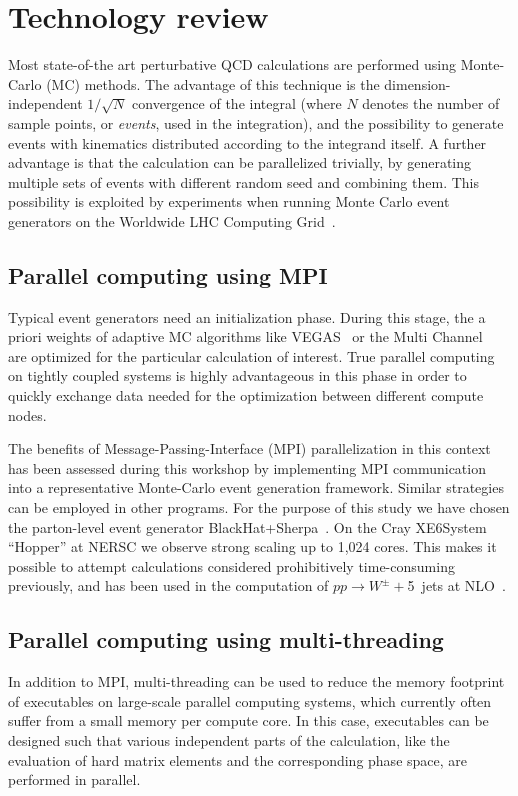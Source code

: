 \section{Technology review}
Most state-of-the art perturbative QCD calculations are performed
using Monte-Carlo (MC) methods. The advantage of this technique
is the dimension-independent $1/\sqrt{N}$ convergence of the integral
(where $N$ denotes the number of sample points, or \textit{events}, 
used in the integration), and the possibility to generate events
with kinematics distributed according to the integrand
itself. A further advantage is that the calculation can be
parallelized trivially, by generating multiple sets of events with
different random seed and combining them. This possibility is
exploited by experiments when running Monte Carlo event generators on
the Worldwide LHC Computing Grid~\cite{WLCG}. 

\subsection{Parallel computing using MPI}
Typical event generators need an initialization phase. During this
stage, the a priori weights of adaptive MC algorithms like
VEGAS~\cite{Lepage:1977sw} or the Multi Channel~\cite{Kleiss:1994qy}
are optimized for the particular calculation of interest. True
parallel computing on tightly coupled systems is highly advantageous 
in this phase in order to quickly exchange data needed for the 
optimization between different compute nodes.

The benefits of Message-Passing-Interface (MPI) parallelization
in this context has been assessed during this workshop by implementing
MPI communication into a representative Monte-Carlo event generation
framework. Similar strategies can be employed in other programs.  For
the purpose of this study we have chosen the parton-level event generator
BlackHat+Sherpa~\cite{Berger:2008sj,Gleisberg:2003xi,Gleisberg:2008ta}.
On the Cray XE6\trademark System ``Hopper'' at NERSC we observe 
strong scaling up to 1,024 cores. This makes it possible to attempt
calculations considered prohibitively time-consuming previously, 
and has been used in the computation of $pp\to W^\pm+$5~jets 
at NLO~\cite{Bern:2013gka}.

\subsection{Parallel computing using multi-threading}
In addition to MPI, multi-threading can be used to reduce the memory
footprint of executables on large-scale parallel computing systems, which
currently often suffer from a small memory per compute core. In this
case, executables can be designed such that various independent parts
of the calculation, like the evaluation of hard matrix elements and
the corresponding phase space, are performed in parallel.

